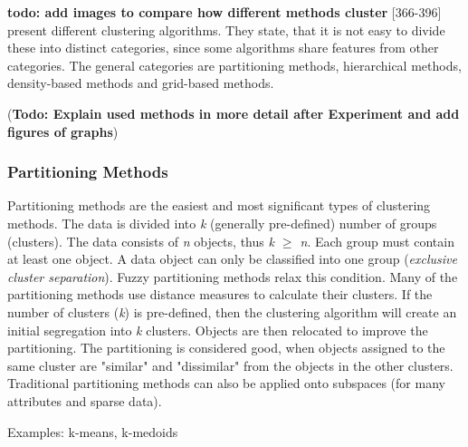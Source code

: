 


\textbf{todo: add images to compare how different methods cluster}
\textcite{han2011data}[366-396] present different clustering algorithms. They state, that it is not easy to divide these into distinct categories, since some algorithms share features from other categories. The general categories are partitioning methods, hierarchical methods, density-based methods and grid-based methods.

(\textbf{Todo: Explain used methods in more detail after Experiment and add figures of graphs})
  \subsubsection{Partitioning Methods}
  Partitioning methods are the easiest and most significant types of clustering methods. The data is divided into \textit{k} (generally pre-defined) number of groups (clusters). The data consists of \textit{n} objects, thus \textit{k $\geq$ n}. Each group must contain at least one object. A data object can only be classified into one group (\textit{exclusive cluster separation}). Fuzzy partitioning methods relax this condition.
  Many of the partitioning methods use distance measures to calculate their clusters. If the number of clusters (\textit{k}) is pre-defined, then the clustering algorithm will create an initial segregation into \textit{k} clusters. Objects are then relocated to improve the partitioning. The partitioning is considered good, when objects assigned to the same cluster are "similar" and "dissimilar" from the objects in the other clusters. Traditional partitioning methods can also be applied onto subspaces (for many attributes and sparse data). 
  
  Examples: k-means, k-medoids



